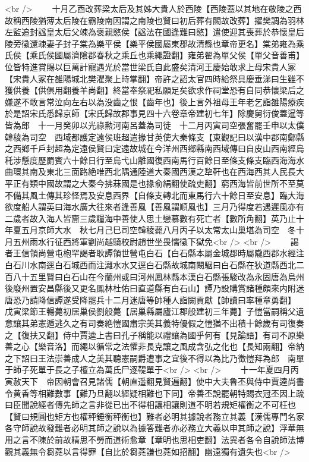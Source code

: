 <br />
　　十月乙酉改葬梁太后及其姊大貴人於西陵【西陵蓋以其地在敬陵之西故稱西陵猶薄太后陵在霸陵南因謂之南陵也賢曰初后葬有闕故改葬】擢樊調為羽林左監追封諡皇太后父竦為褒親愍侯【諡法在國逢難曰愍】遣使迎其喪葬於恭懷皇后陵旁徵還竦妻子封子棠為樂平侯【樂平侯國屬東郡故清縣也章帝更名】棠弟雍為乘氏侯【乘氏侯國屬濟隂郡春秋之乘丘也乘繩證翻】雍弟翟為單父侯【單父音善甫】位皆特進賞賜以巨萬計寵遇光於當世梁氏自此盛矣清河王慶始敢求上母宋貴人冢【宋貴人冢在雒陽城北樊濯聚上時掌翻】帝許之詔太官四時給祭具慶垂涕曰生雖不獲供養【供俱用翻養羊尚翻】終當奉祭祀私願足矣欲求作祠堂恐有自同恭懷梁后之嫌遂不敢言常泣向左右以為没齒之恨【齒年也】後上言外祖母王年老乞詣雒陽療疾於是詔宋氏悉歸京師【宋氏歸故郡事見四十六卷章帝建初七年】除慶舅衍俊蓋暹等皆為郎　十一月癸卯以光祿勲河南呂蓋為司徒　十二月丙寅司空張奮罷壬申以太僕韓稜為司空　西域都護定遠侯班超遣掾甘英使大秦條支【東觀記曰以漢中郡南鄭縣之西鄉千戶封超為定遠侯賢曰定遠故城在今洋州西鄉縣南西域傳曰自皮山西南經烏秅涉懸度歷罽賓六十餘日行至烏弋山離國復西南馬行百餘日至條支條支臨西海海水曲環其南及東北三面路絶唯西北隅通陸道大秦國西漢之犂靬也在西海西其人民長大平正有類中國故謂之大秦今拂菻國是也掾俞絹翻使疏吏翻】窮西海皆前世所不至莫不備其風土傳其珍怪焉及安息西界【自條支轉北而東馬行六十餘日至安息】臨大海欲度船人謂英曰海水廣大往來者逢善風【善風謂順風也】三月乃得度若遇遲風亦有二歲者故入海人皆齎三歲糧海中善使人思土戀慕數有死亡者【數所角翻】英乃止十年夏五月京師大水　秋七月己巳司空韓稜薨八月丙子以太常太山巢堪為司空　冬十月五州雨水行征西將軍劉尚越騎校尉趙世坐畏懦徵下獄免<br />
<br />
　　謁者王信領尚營屯枹罕謁者耿譚領世營屯白石【白石縣本屬金城郡時屬隴西郡水經注白石川水南逕白石城西而注灕水水又逕白石縣故城南闞駰曰白石縣在狄道縣西北二百八十五里賢曰白石山在今蘭州或曰河州鳳林縣本漢白石縣張駿改為永固唐為烏州後廢州置安昌縣後又更名鳳林杜佑曰直道縣有白石山】譚乃設購賞諸種頗來内附迷唐恐乃請降信譚遂受降罷兵十二月迷唐等帥種人詣闕貢獻【帥讀曰率種章勇翻】　戊寅梁節王暢薨初居巢侯劉般薨【居巢縣屬廬江郡般建初三年薨】子愷當嗣稱父遺意讓其弟憲遁逃久之有司奏絶愷國肅宗美其義特優假之愷猶不出積十餘歲有司復奏之【復扶又翻】侍中賈逵上書曰孔子稱能以禮讓為國乎何有【見論語】有司不原樂善之心【樂音洛】而繩以循常之法懼非長克讓之風成含弘之化也【長知兩翻】帝納之下詔曰王法崇善成人之美其聽憲嗣爵遭事之宜後不得以為比乃徵愷拜為郎　南單于師子死單于長之子檀立為萬氏尸逐鞮單于<br />
<br />
　　十一年夏四月丙寅赦天下　帝因朝會召見諸儒【朝直遥翻見賢遍翻】使中大夫魯丕與侍中賈逵尚書令黄香等相難數事【難乃旦翻以經疑相難也下同】帝善丕說罷朝特賜衣冠丕因上疏曰臣聞說經者傳先師之言非從已出不得相讓相讓則道不明若規矩權衡之不可枉也【賢曰規圓也矩方也權秤錘衡秤衡也】難者必明其據說者務立其義【漢儒專門名家各守師說故發難者必明其師之說以為據答難者亦必務立大義以申其師之說】浮華無用之言不陳於前故精思不勞而道術愈章【章明也思相吏翻】法異者各令自說師法博觀其義無令芻蕘以言得罪【自比於芻蕘謙也蕘如招翻】幽遠獨有遺失也<br />
